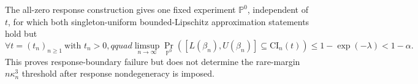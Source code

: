 The all-zero response construction gives one fixed experiment \(\mathbb P^0\), independent of \(t\), for which both singleton-uniform bounded-Lipschitz approximation statements hold but
\[
\forall t=(t_n)_{n\geq1}\ \text{with }t_n>0,qquad
\limsup_{n\to\infty}
\Pr_{\mathbb P^0}\!\left(
[L(\beta_n),U(\beta_n)]\subseteq\mathrm{CI}_n(t)
\right)
\leq1-\exp(-\lambda)<1-\alpha.
\]
This proves response-boundary failure but does not determine the rare-margin \(n\kappa_n^3\) threshold after response nondegeneracy is imposed.
